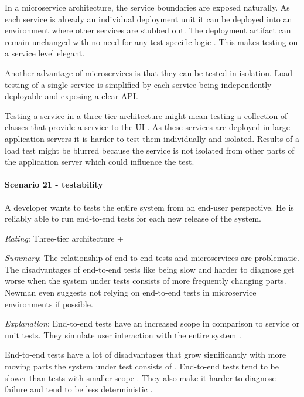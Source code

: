 In a microservice architecture, the service boundaries are exposed naturally.
As each service is already an individual deployment unit it can be deployed into an environment where other services are stubbed out.
The deployment artifact can remain unchanged with no need for any test specific logic \citep[p. 16f.]{Clemson2014}.
This makes testing on a service level elegant.

Another advantage of microservices is that they can be tested in isolation.
Load testing of a single service is simplified by each service being independently deployable and exposing a clear \ac{API}.

Testing a service in a three-tier architecture might mean testing a collection of classes that provide a service to the \ac{UI} \citep[p. 134]{Newman2015}.
As these services are deployed in large application servers it is harder to test them individually and isolated.
Results of a load test might be blurred because the service is not isolated from other parts of the application server which could influence the test.

\paragraph{Scenario 21 - testability}
A developer wants to tests the entire system from an end-user perspective. He is reliably able to run end-to-end tests for each new release of the system.
\label{quaMicro:s21}

\textit{Rating}: Three-tier architecture +

\textit{Summary}: 
The relationship of end-to-end tests and microservices are problematic.
The disadvantages of end-to-end tests like being slow and harder to diagnose get worse when the system under tests consists of more frequently changing parts.
Newman even suggests not relying on end-to-end tests in microservice environments if possible. \citep[p. 147]{Newman2015}

\textit{Explanation}:
End-to-end tests have an increased scope in comparison to service or unit tests.
They simulate user interaction with the entire system \citep[p. 138]{Newman2015}.

End-to-end tests have a lot of disadvantages that grow significantly with more moving parts the system under test consists of \citep[p. 147]{Newman2015}.
End-to-end tests tend to be slower than tests with smaller scope  \citep[p. 138]{Newman2015}.
They also make it harder to diagnose failure and tend to be less deterministic \citep[p. 138, 140]{Newman2015}.

